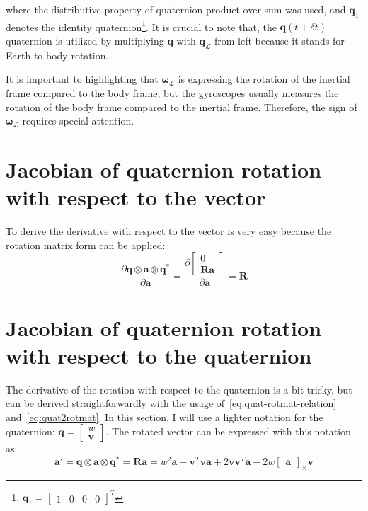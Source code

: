 where the distributive property of quaternion product over sum was used, and $\mathbf{q}_1$ denotes the identity quaternion\footnote{$\mathbf{q}_1=\begin{bmatrix} 1 & 0 & 0 & 0 \end{bmatrix}^T$}. It is crucial to note that, the $\mathbf{q}(t+\delta t)$ quaternion is utilized by multiplying $\mathbf{q}$ with $\mathbf{q}_\mathcal{L}$ from left because it stands for Earth-to-body rotation.

It is important to highlighting that $\boldsymbol{\omega}_\mathcal{L}$ is expressing the rotation of the inertial frame compared to the body frame, but the gyroscopes usually measures the rotation of the body frame compared to the inertial frame. Therefore, the sign of $\boldsymbol{\omega}_\mathcal{L}$ requires special attention.

\section{Jacobian of quaternion rotation with respect to the vector}\label{app:der-rot-by-vec}

To derive the derivative with respect to the vector is very easy because the rotation matrix form can be applied:
\begin{equation}
    \frac{\partial\mathbf{q}\otimes\mathbf{a}\otimes\mathbf{q}^*}{\partial\mathbf{a}}=\frac{\partial\begin{bmatrix}
        0 \\ \mathbf{R}\mathbf{a}
    \end{bmatrix}}{\partial \mathbf{a}}=\mathbf{R}
\end{equation}

\section{Jacobian of quaternion rotation with respect to the quaternion}\label{app:der-rot-by-quat}

The derivative of the rotation with respect to the quaternion is a bit tricky, but can be derived straightforwardly with the usage of~\eqref{eq:quat-rotmat-relation} and~\eqref{eq:quat2rotmat}. In this section, I will use a lighter notation for the quaternion: $\mathbf{q}=\begin{bmatrix} w \\ \mathbf{v} \end{bmatrix}$. The rotated vector can be expressed with this notation as:
\begin{equation}
    \mathbf{a}'=\mathbf{q}\otimes\mathbf{a}\otimes\mathbf{q}^*=\mathbf{R}\mathbf{a}=w^2\mathbf{a}-\mathbf{v}^T\mathbf{v}\mathbf{a}+2\mathbf{v}\mathbf{v}^T\mathbf{a}-2w\begin{bmatrix}
        \mathbf{a}
    \end{bmatrix}_\times \mathbf{v}
\end{equation}

